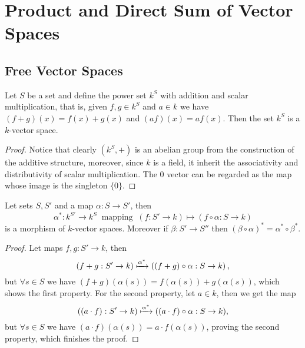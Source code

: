 \section{Product and Direct Sum of Vector Spaces}

\subsection{Free Vector Spaces}

\begin{proposition}
   Let \(S\) be a set and define the power set \(k^S\) with addition and
   scalar multiplication, that is, given \(f, g \in k^S\) and \(a \in k\) we
   have \((f + g)(x) = f(x) + g(x)\) and \((a f)(x) = af(x)\). Then the set
   \(k^S\) is a \(k\)-vector space.
\end{proposition}

\begin{proof}
   Notice that clearly \((k^S, +)\) is an abelian group from the construction of
   the additive structure, moreover, since \(k\) is a field, it inherit the
   associativity and distributivity of scalar multiplication. The \(0\) vector
   can be regarded as the map whose image is the singleton \(\{0\}\).
\end{proof}

\begin{proposition}[Functoriality of \(k^S\)]
   Let sets \(S, S'\) and a map \(\alpha : S \to S'\), then
   \[
      \alpha^\ast : k^{S'} \to k^S \ \text{ mapping }\ (f : S' \to k) \mapsto
      (f \circ \alpha : S \to k)
   \]
   is a morphism of \(k\)-vector spaces. Moreover if \(\beta : S' \to S''\) then
   \((\beta \circ \alpha)^\ast = \alpha^\ast \circ \beta^\ast\).
\end{proposition}

\begin{proof}
   Let maps \(f, g : S' \to k\), then
   \[
      (f + g : S' \to k) \xmapsto{\alpha^\ast} \left( (f + g)\circ \alpha : S
      \to k \right),
   \]
   but \(\forall s \in S\) we have \((f + g)(\alpha(s)) = f(\alpha(s)) +
   g(\alpha(s))\), which shows the first property. For the second property, let
   \(a \in k\), then we get the map
   \[
      ((a \cdot f) : S' \to k) \xmapsto{\alpha^\ast} ( (a \cdot f) \circ \alpha
      : S \to k),
   \]
   but \(\forall s \in S\) we have \((a \cdot f)(\alpha(s)) = a \cdot
   f(\alpha(s))\), proving the second property, which finishes the proof.
\end{proof}

